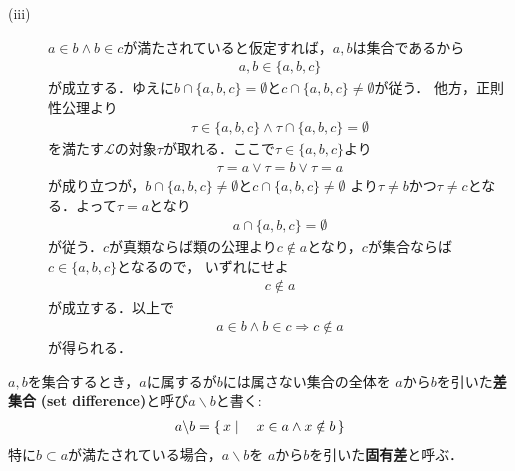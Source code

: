 \begin{prf}
\begin{description}
			\item[(iii)]
				$a \in b \wedge b \in c$が満たされていると仮定すれば，$a,b$は集合であるから
				\begin{align}
					a,b \in \{a,b,c\}
				\end{align}
				が成立する．ゆえに$b \cap \{a,b,c\} = \emptyset$と$c \cap \{a,b,c\} \neq \emptyset$が従う．
				他方，正則性公理より
				\begin{align}
					\tau \in \{a,b,c\} \wedge \tau \cap \{a,b,c\} = \emptyset
				\end{align}
				を満たす$\mathcal{L}$の対象$\tau$が取れる．ここで$\tau \in \{a,b,c\}$より
				\begin{align}
					\tau = a \vee \tau = b \vee \tau = a
				\end{align}
				が成り立つが，$b \cap \{a,b,c\} \neq \emptyset$と$c \cap \{a,b,c\} \neq \emptyset$
				より$\tau \neq b$かつ$\tau \neq c$となる．よって$\tau = a$となり
				\begin{align}
					a \cap \{a,b,c\} = \emptyset
				\end{align}
				が従う．$c$が真類ならば類の公理より$c \notin a$となり，$c$が集合ならば$c \in \{a,b,c\}$となるので，
				いずれにせよ
				\begin{align}
					c \notin a
				\end{align}
				が成立する．以上で
				\begin{align}
					a \in b \wedge b \in c \Longrightarrow c \notin a
				\end{align}
				が得られる．
				\QED
		\end{description}
	\end{prf}
	
	
	\begin{screen}
		\begin{dfn}[差集合]
			$a,b$を集合するとき，$a$に属するが$b$には属さない集合の全体を
			$a$から$b$を引いた{\bf 差集合}
			{\bf (set difference)}と呼び$a \backslash b$と書く:
			\begin{align}
				a \backslash b = \left\{\, x \mid \quad x \in a \wedge x \notin b\, \right\}
			\end{align}
			特に$b \subset a$が満たされている場合，$a \backslash b$を
			$a$から$b$を引いた{\bf 固有差}と呼ぶ．
		\end{dfn}
	\end{screen}
	
